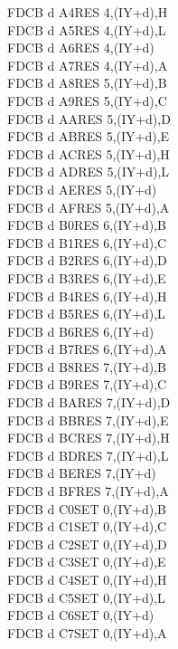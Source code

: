 \documentclass[12pt,twoside,openright,a4paper]{book}
\begin{document}
\begin{multicols}{3}
{\begin{tabbing}
	FDCB d A4\>RES 4,(IY+d),H\UNDOC\\
	FDCB d A5\>RES 4,(IY+d),L\UNDOC\\
	FDCB d A6\>RES 4,(IY+d)\\
	FDCB d A7\>RES 4,(IY+d),A\UNDOC\\
	FDCB d A8\>RES 5,(IY+d),B\UNDOC\\
	FDCB d A9\>RES 5,(IY+d),C\UNDOC\\
	FDCB d AA\>RES 5,(IY+d),D\UNDOC\\
	FDCB d AB\>RES 5,(IY+d),E\UNDOC\\
	FDCB d AC\>RES 5,(IY+d),H\UNDOC\\
	FDCB d AD\>RES 5,(IY+d),L\UNDOC\\
	FDCB d AE\>RES 5,(IY+d)\\
	FDCB d AF\>RES 5,(IY+d),A\UNDOC\\
	FDCB d B0\>RES 6,(IY+d),B\UNDOC\\
	FDCB d B1\>RES 6,(IY+d),C\UNDOC\\
	FDCB d B2\>RES 6,(IY+d),D\UNDOC\\
	FDCB d B3\>RES 6,(IY+d),E\UNDOC\\
	FDCB d B4\>RES 6,(IY+d),H\UNDOC\\
	FDCB d B5\>RES 6,(IY+d),L\UNDOC\\
	FDCB d B6\>RES 6,(IY+d)\\
	FDCB d B7\>RES 6,(IY+d),A\UNDOC\\
	FDCB d B8\>RES 7,(IY+d),B\UNDOC\\
	FDCB d B9\>RES 7,(IY+d),C\UNDOC\\
	FDCB d BA\>RES 7,(IY+d),D\UNDOC\\
	FDCB d BB\>RES 7,(IY+d),E\UNDOC\\
	FDCB d BC\>RES 7,(IY+d),H\UNDOC\\
	FDCB d BD\>RES 7,(IY+d),L\UNDOC\\
	FDCB d BE\>RES 7,(IY+d)\\
	FDCB d BF\>RES 7,(IY+d),A\UNDOC\\
	FDCB d C0\>SET 0,(IY+d),B\UNDOC\\
	FDCB d C1\>SET 0,(IY+d),C\UNDOC\\
	FDCB d C2\>SET 0,(IY+d),D\UNDOC\\
	FDCB d C3\>SET 0,(IY+d),E\UNDOC\\
	FDCB d C4\>SET 0,(IY+d),H\UNDOC\\
	FDCB d C5\>SET 0,(IY+d),L\UNDOC\\
	FDCB d C6\>SET 0,(IY+d)\\
	FDCB d C7\>SET 0,(IY+d),A\UNDOC\\

\end{tabbing}}
\end{multicols}
\end{document}
